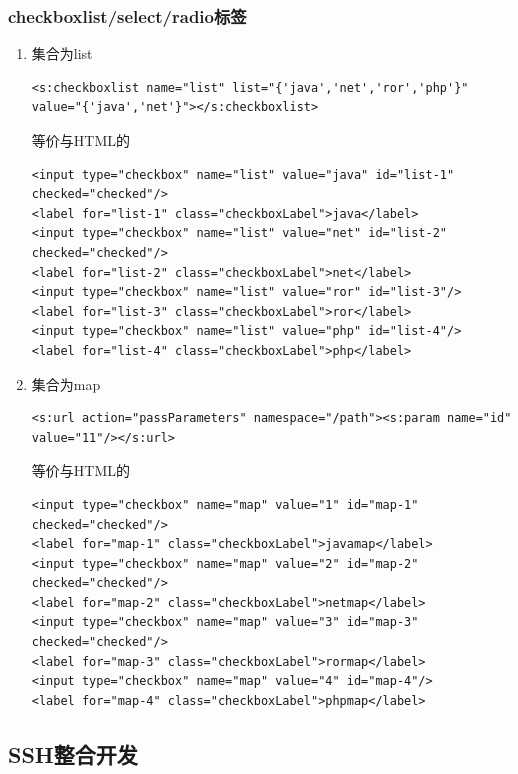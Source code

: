\subsubsection{checkboxlist/select/radio标签}
\begin{enumerate}
\item 集合为list
\begin{lstlisting}[style=JAVA]
<s:checkboxlist name="list" list="{'java','net','ror','php'}" value="{'java','net'}"></s:checkboxlist>
\end{lstlisting}
等价与HTML的
\begin{lstlisting}[style=JAVA]
<input type="checkbox" name="list" value="java" id="list-1" checked="checked"/>
<label for="list-1" class="checkboxLabel">java</label>
<input type="checkbox" name="list" value="net" id="list-2" checked="checked"/>
<label for="list-2" class="checkboxLabel">net</label>
<input type="checkbox" name="list" value="ror" id="list-3"/>
<label for="list-3" class="checkboxLabel">ror</label>
<input type="checkbox" name="list" value="php" id="list-4"/>
<label for="list-4" class="checkboxLabel">php</label>
\end{lstlisting}
\item 集合为map
\begin{lstlisting}[style=JAVA]
<s:url action="passParameters" namespace="/path"><s:param name="id" value="11"/></s:url>
\end{lstlisting}
等价与HTML的
\begin{lstlisting}[style=JAVA]
<input type="checkbox" name="map" value="1" id="map-1" checked="checked"/>
<label for="map-1" class="checkboxLabel">javamap</label>
<input type="checkbox" name="map" value="2" id="map-2" checked="checked"/>
<label for="map-2" class="checkboxLabel">netmap</label>
<input type="checkbox" name="map" value="3" id="map-3" checked="checked"/>
<label for="map-3" class="checkboxLabel">rormap</label>
<input type="checkbox" name="map" value="4" id="map-4"/>
<label for="map-4" class="checkboxLabel">phpmap</label>
\end{lstlisting}
\end{enumerate}

\subsection{SSH整合开发}
